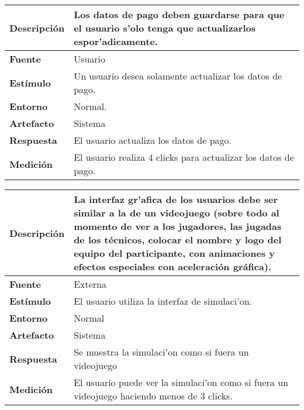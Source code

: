 \begin{center}
  \begin{tabular}{| l | p{10cm} | }
    \hline
  \textbf{Descripción} & Los datos de pago deben guardarse para que el usuario s'olo tenga que actualizarlos espor'adicamente.\\  \hline
  \textbf{Fuente} & Usuario\\  \hline
  \textbf{Estímulo} & Un usuario desea solamente actualizar los datos de pago.\\  \hline
  \textbf{Entorno} & Normal.\\  \hline
  \textbf{Artefacto} & Sistema\\  \hline
  \textbf{Respuesta} & El usuario actualiza los datos de pago.\\  \hline
  \textbf{Medición} & El usuario realiza 4 clicks para actualizar los datos de pago.\\  \hline
  \end{tabular}
\end{center} 


\begin{center}
  \begin{tabular}{| l | p{10cm} | }
    \hline
  \textbf{Descripción} & La interfaz gr'afica de los usuarios debe ser similar a la de un videojuego (sobre todo al momento de ver a los jugadores, las jugadas de los técnicos, colocar el nombre y logo del equipo del participante, con animaciones y efectos especiales con aceleración gráfica). \\  \hline
  \textbf{Fuente} & Externa\\  \hline
  \textbf{Estímulo} & El usuario utiliza la interfaz de simulaci'on.\\  \hline
  \textbf{Entorno} & Normal\\  \hline
  \textbf{Artefacto} & Sistema\\  \hline
  \textbf{Respuesta} & Se muestra la simulaci'on como si fuera un videojuego\\  \hline
  \textbf{Medición} & El usuario puede ver la simulaci'on como si fuera un videojuego haciendo menos de 3 clicks.\\  \hline
  \end{tabular}
\end{center} 



